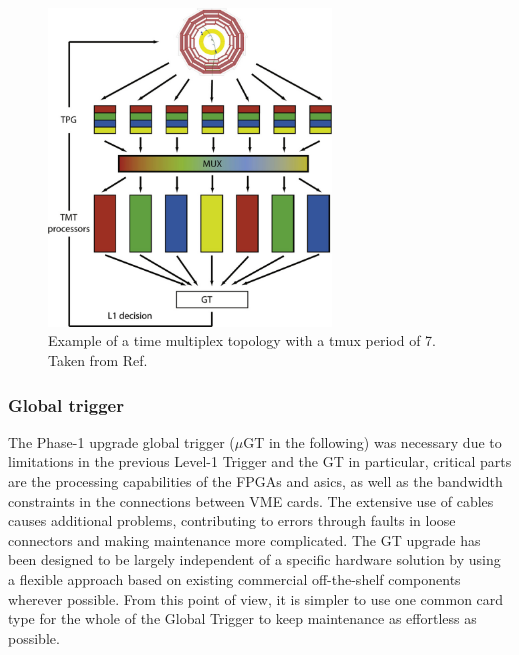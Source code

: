 \documentclass[../../main.tex]{subfiles}
\begin{document}
\begin{figure}[h]
    \centering
    \includegraphics[width=0.67\textwidth]{sections/02/Images/TMUX.png}
    \caption{Example of a time multiplex topology with a \acrshort{tmux} period of 7. Taken from Ref. \cite{TMUX}}
    \label{fig:TMUX}
\end{figure}

\subsubsection{Global trigger}
\label{Phase-1_l1T_arch}

The Phase-1 upgrade global trigger ($\mu$GT in the following) was necessary due to limitations in the previous Level-1 Trigger and the GT in particular, critical parts are the processing capabilities of the FPGAs and \acrshort{asic}s, as well as the bandwidth constraints in the connections between VME cards. The extensive use of cables causes additional problems, contributing to errors through faults in loose connectors and making maintenance more complicated. The GT upgrade has been designed to be largely independent of a specific hardware solution by using a flexible approach based on existing commercial off-the-shelf components wherever possible. From this point of view, it is simpler to use one common card type for the whole of the Global Trigger to keep maintenance as effortless as possible.
\end{document}

